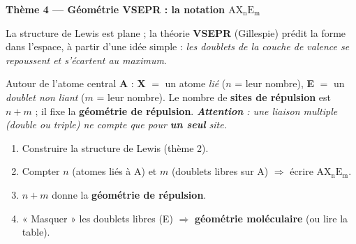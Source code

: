 \documentclass[11pt,a4paper]{article}
\begin{document}
\newcommand{\AX}[2]{\ensuremath{\mathrm{AX_{#1}E_{#2}}}}
\begin{center}
{\Large\bfseries\color{primarydark} Thème 4 — Géométrie VSEPR : la notation \AX{n}{m}}
\end{center}

\smallskip
La structure de Lewis est plane ; la théorie \textbf{VSEPR} (Gillespie) prédit la forme dans
l'espace, à partir d'une idée simple : \emph{les doublets de la couche de valence se repoussent et
s'écartent au maximum}.

\begin{cle}[La notation \AX{n}{m}]
Autour de l'atome central \textbf{A} : \textbf{X} $=$ un atome \emph{lié} ($n$ = leur nombre),
\textbf{E} $=$ un \emph{doublet non liant} ($m$ = leur nombre). Le nombre de \textbf{sites de
répulsion} est $n+m$ ; il fixe la \textbf{géométrie de répulsion}.
\emph{\textbf{Attention} : une liaison multiple (double ou triple) ne compte que pour \textbf{un
seul} site.}
\end{cle}

\begin{methode}
\begin{enumerate}[leftmargin=1.9em,topsep=2pt,itemsep=1pt]
  \item Construire la structure de Lewis (thème 2).
  \item Compter $n$ (atomes liés à A) et $m$ (doublets libres sur A) $\Rightarrow$ écrire \AX{n}{m}.
  \item $n+m$ donne la \textbf{géométrie de répulsion}.
  \item « Masquer » les doublets libres (E) $\Rightarrow$ \textbf{géométrie moléculaire}
        (ou lire la table).
\end{enumerate}
\end{methode}
\end{document}
